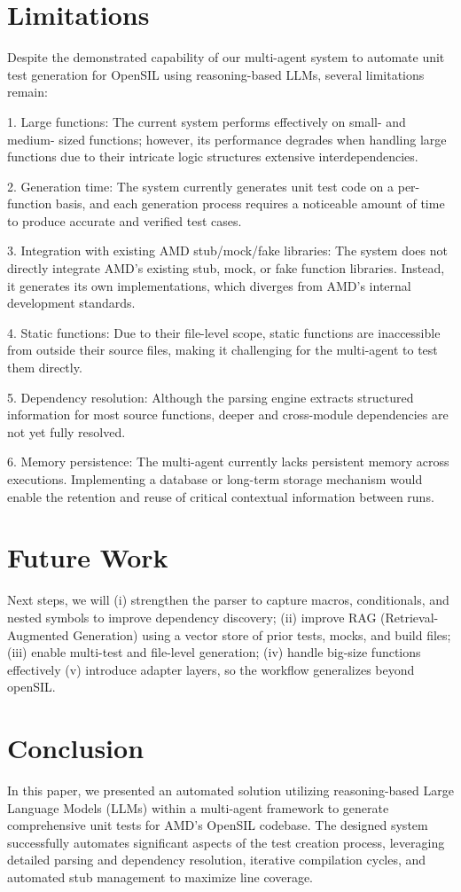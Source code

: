 \documentclass[conference]{IEEEtran}
\begin{document}
\section{Limitations}
Despite the demonstrated capability of our multi-agent system to automate unit test generation for OpenSIL using reasoning-based LLMs, several limitations remain: 

1. Large functions: The current system performs effectively on small- and medium- sized functions; however, its performance degrades when handling large functions due to their intricate logic structures extensive interdependencies. 

2. Generation time: The system currently generates unit test code on a per-function basis, and each generation process requires a noticeable amount of time to produce accurate and verified test cases. 

3. Integration with existing AMD stub/mock/fake libraries: The system does not directly integrate AMD’s existing stub, mock, or fake function libraries. Instead, it generates its own implementations, which diverges from AMD’s internal development standards. 

4. Static functions: Due to their file-level scope, static functions are inaccessible from outside their source files, making it challenging for the multi-agent to test them directly.

5. Dependency resolution: Although the parsing engine extracts structured information for most source functions, deeper and cross-module dependencies are not yet fully resolved. 

6. Memory persistence: The multi-agent currently lacks persistent memory across executions. Implementing a database or long-term storage mechanism would enable the retention and reuse of critical contextual information between runs.

\section{Future Work}
Next steps, we will (i) strengthen the parser to capture macros, conditionals, and nested symbols to improve dependency discovery; (ii) improve RAG (Retrieval-Augmented Generation) using a vector store of prior tests, mocks, and build files; (iii) enable multi-test and file-level generation; (iv) handle big-size functions effectively (v) introduce adapter layers, so the workflow generalizes beyond openSIL.


\section{Conclusion}
In this paper, we presented an automated solution utilizing reasoning-based Large Language Models (LLMs) within a multi-agent framework to generate comprehensive unit tests for AMD’s OpenSIL codebase. The designed system successfully automates significant aspects of the test creation process, leveraging detailed parsing and dependency resolution, iterative compilation cycles, and automated stub management to maximize line coverage. 
\end{document}
